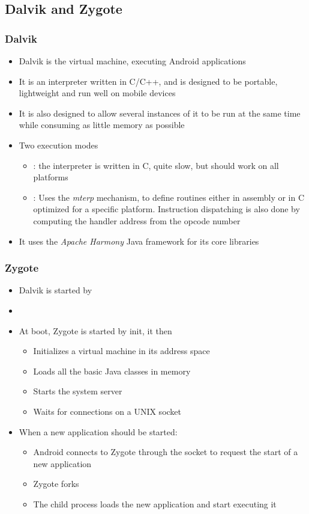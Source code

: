 \subsection{Dalvik and Zygote}
\begin{frame}
  \frametitle{Dalvik}
  \begin{itemize}
  \item Dalvik is the virtual machine, executing Android applications
  \item It is an interpreter written in C/C++, and is designed to be portable,
    lightweight and run well on mobile devices
  \item It is also designed to allow several instances of it to be run
    at the same time while consuming as little memory as possible
  \item Two execution modes
    \begin{itemize}
    \item {}: the interpreter is written in C, quite
      slow, but should work on all platforms
    \item {}: Uses the \emph{mterp} mechanism, to define
      routines either in assembly or in C optimized for a specific
      platform. Instruction dispatching is also done by computing the
      handler address from the opcode number
    \end{itemize}
  \item It uses the \emph{Apache Harmony} Java framework for its core
    libraries
  \end{itemize}
\end{frame}

\begin{frame}
  \frametitle{Zygote}
  \begin{itemize}
    \item Dalvik is started by 
    \item {}
    \item At boot, Zygote is started by init, it then
      \begin{itemize}
      \item Initializes a virtual machine in its address space
      \item Loads all the basic Java classes in memory
      \item Starts the system server
      \item Waits for connections on a UNIX socket
      \end{itemize}
    \item When a new application should be started:
      \begin{itemize}
      \item Android connects to Zygote through the socket to request
        the start of a new application
      \item Zygote forks
      \item The child process loads the new application and start
        executing it
      \end{itemize}
  \end{itemize}
\end{frame}
